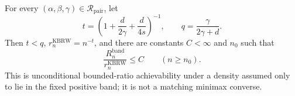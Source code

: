 For every \((\alpha,\beta,\gamma)\in\mathcal R_{\mathrm{pair}}\), let
\[
t=\left(1+\frac d{2\gamma}+\frac d{4s}\right)^{-1},
\qquad q=\frac\gamma{2\gamma+d}.
\]
Then \(t<q\), \(r_n^{\mathrm{KBRW}}=n^{-t}\), and there are constants
\(C<\infty\) and \(n_0\) such that
\[
\frac{R_n^{\mathrm{band}}}{r_n^{\mathrm{KBRW}}}\leq C
\qquad(n\geq n_0).
\]
This is unconditional bounded-ratio achievability under a density assumed only
to lie in the fixed positive band; it is not a matching minimax converse.